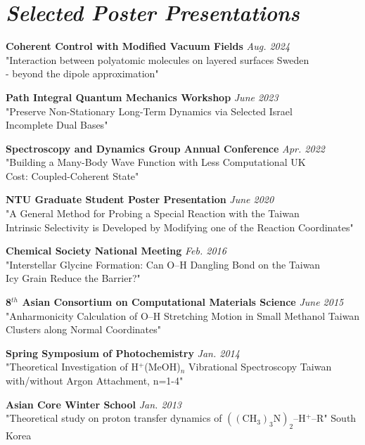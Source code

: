 \section{\sl Selected Poster Presentations}
{\bf Coherent Control with Modified Vacuum Fields}
\hfill \textit{Aug. 2024} \\
"Interaction between polyatomic molecules on layered surfaces \hfill Sweden \\
- beyond the dipole approximation"

{\bf Path Integral Quantum Mechanics Workshop}
\hfill \textit{June 2023} \\
"Preserve Non-Stationary Long-Term Dynamics via Selected \hfill Israel \\
Incomplete Dual
Bases"  


{\bf Spectroscopy and Dynamics Group Annual Conference}
\hfill \textit{Apr. 2022} \\
"Building a Many-Body Wave Function with Less Computational 
\hfill UK\\
Cost: Coupled-Coherent State"

{\bf  NTU Graduate Student Poster Presentation}
\hfill \textit{June 2020} \\
"A General Method for Probing a Special Reaction with the
\hfill Taiwan \\
Intrinsic Selectivity is Developed by Modifying one of the Reaction Coordinates"


{\bf Chemical Society National Meeting}
\hfill \textit{Feb. 2016}\\
"Interstellar Glycine Formation: Can O--H Dangling Bond on the 
\hfill Taiwan \\
Icy Grain Reduce the Barrier?"


{\bf 8$^{th}$ Asian Consortium on Computational Materials Science}
\hfill \textit{June 2015}\\
"Anharmonicity Calculation of O--H Stretching Motion in Small Methanol
\hfill Taiwan \\
 Clusters along Normal Coordinates" 

{\bf Spring Symposium of Photochemistry}
\hfill \textit{Jan. 2014}\\
"Theoretical Investigation of H$^+$(MeOH)$_n$ Vibrational Spectroscopy 
\hfill Taiwan \\
with/without Argon Attachment, n=1-4"

{\bf Asian Core Winter School}
\hfill \textit{Jan. 2013}\\
"Theoretical study on proton transfer dynamics of $\mathrm{((CH_3)_3N)_2}$--H$^+$--R"
\hfill South Korea 

\endinput